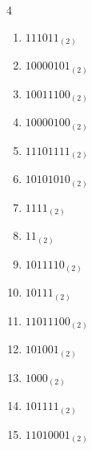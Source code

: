 \begin{multicols}{4}
\begin{enumerate}
        \phantom{$=224$}

  \item $111011_{(2)}$

        \phantom{$=59$}

\columnbreak %

\resetques

  \item $10000101_{(2)}$

        \phantom{$=133$}

  \item $10011100_{(2)}$

        \phantom{$=156$}

  \item $10000100_{(2)}$

        \phantom{$=132$}

  \item $11101111_{(2)}$

        \phantom{$=239$}

  \item $10101010_{(2)}$

        \phantom{$=170$}

  \item $1111_{(2)}$

        \phantom{$=15$}

  \item $11_{(2)}$

        \phantom{$=3$}

  \item $1011110_{(2)}$

        \phantom{$=94$}

  \item $10111_{(2)}$

        \phantom{$=23$}

  \item $11011100_{(2)}$

        \phantom{$=220$}

  \item $101001_{(2)}$

        \phantom{$=41$}

  \item $1000_{(2)}$

        \phantom{$=8$}

  \item $101111_{(2)}$

        \phantom{$=47$}

  \item $11010001_{(2)}$


\end{enumerate}
\end{multicols}
